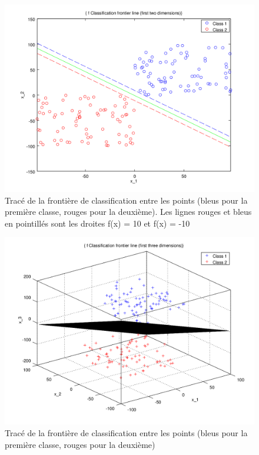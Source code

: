 \documentclass{article}
\begin{document}
         \begin{figure}
           \begin{center}
             \includegraphics[scale=0.5]{images/line3.png}
             \caption{Tracé de la frontière de classification entre les points (bleus pour la première classe, rouges pour la deuxième). Les lignes rouges et bleus en pointillés sont les droites f(x) = 10 et f(x) = -10}
           \end{center}
         \end{figure}

         \begin{figure}
           \begin{center}
             \includegraphics[scale=0.5]{images/plane3.png}
             \caption{Tracé de la frontière de classification entre les points (bleus pour la première classe, rouges pour la deuxième)}
           \end{center}
         \end{figure}
\end{document}
